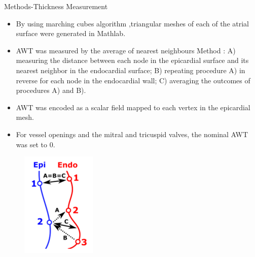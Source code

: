 \documentclass[aspectratio=43]{beamer}
\begin{document}
 \begin{frame}{Methods-Thickness Measurement}
\begin{minipage}{0.8\textwidth}\raggedleft
\begin{itemize}
        \item By using marching cubes algorithm ,triangular meshes of each of the atrial surface were generated in Mathlab.
        \item AWT was measured by the average of nearest neighbours Method : A) measuring the distance between each node in the epicardial surface and its nearest neighbor in the endocardial surface; B) repeating procedure A) in reverse for each node in the endocardial wall; C) averaging the outcomes of procedures A) and B).   
        \item AWT was encoded as a scalar field mapped to each vertex in the epicardial mesh.
        \item For vessel openings and the mitral and tricuspid valves, the nominal AWT was set to 0.
     
\end{itemize}
\end{minipage}
\begin{minipage}{0.2\textwidth}\raggedleft
\begin{figure}[h!]


\includegraphics[width=\linewidth]{img/img3}


\end{figure}
\end{minipage}
\end{frame}
\end{document}
